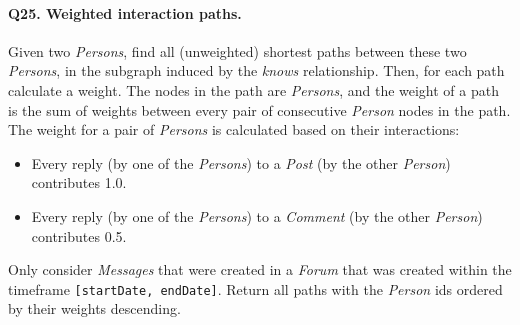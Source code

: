 \paragraph{\textbf{Q25}. Weighted interaction paths.}
Given two \emph{Persons}, find all (unweighted) shortest paths between
these two \emph{Persons}, in the subgraph induced by the \emph{knows}
relationship.
Then, for each path calculate a weight. The nodes in the path are
\emph{Persons}, and the weight of a path is the sum of weights between
every pair of consecutive \emph{Person} nodes in the path.
The weight for a pair of \emph{Persons} is calculated based on their
interactions:
\begin{itemize}
\tightlist
\item
  Every reply (by one of the \emph{Persons}) to a \emph{Post} (by the
  other \emph{Person}) contributes 1.0.
\item
  Every reply (by one of the \emph{Persons}) to a \emph{Comment} (by the
  other \emph{Person}) contributes 0.5.
\end{itemize}
Only consider \emph{Messages} that were created in a \emph{Forum} that
was created within the timeframe \texttt{{[}startDate,\ endDate{]}}.
Return all paths with the \emph{Person} ids ordered by their weights
descending.
